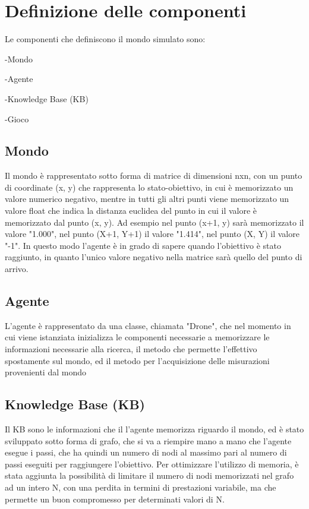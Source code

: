 \section{Definizione delle componenti}
Le componenti che definiscono il mondo simulato sono:

-Mondo

-Agente

-Knowledge Base (KB)

-Gioco

\subsection{Mondo}
Il mondo è rappresentato sotto forma di matrice di dimensioni nxn, con un punto di coordinate (x, y) che rappresenta lo stato-obiettivo, in cui è memorizzato un valore numerico negativo, mentre in tutti gli altri punti viene memorizzato un valore float che indica la distanza euclidea del punto in cui il valore è memorizzato dal punto (x, y). Ad esempio nel punto (x+1, y) sarà memorizzato il valore "1.000", nel punto (X+1, Y+1) il valore "1.414", nel punto (X, Y) il valore "-1". In questo modo l'agente è in grado di sapere quando l'obiettivo è stato raggiunto, in quanto l'unico valore negativo nella matrice sarà quello del punto di arrivo.
\subsection{Agente}
L'agente è rappresentato da una classe, chiamata "Drone", che nel momento in cui viene istanziata inizializza le componenti necessarie a memorizzare le informazioni necessarie alla ricerca, il metodo che permette l'effettivo spostamente sul mondo, ed il metodo per l'acquisizione delle misurazioni provenienti dal mondo
\subsection{Knowledge Base (KB)}
Il KB sono le informazioni che il l'agente memorizza riguardo il mondo, ed è stato sviluppato sotto forma di grafo, che si va a riempire mano a mano che l'agente esegue i passi, che ha quindi un numero di nodi al massimo pari al numero di passi eseguiti per raggiungere l'obiettivo. Per ottimizzare l'utilizzo di memoria, è stata aggiunta la possibilità di limitare il numero di nodi memorizzati nel grafo ad un intero N, con una perdita in termini di prestazioni variabile, ma che permette un buon compromesso per determinati valori di N.
